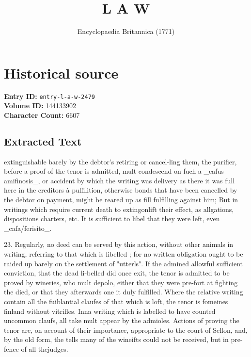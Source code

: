 \documentclass{article}
\title{L A W}
\date{Encyclopaedia Britannica (1771)}
\begin{document}
\maketitle

\section*{Historical source}
\textbf{Entry ID:} \texttt{entry-l-a-w-2479} \\
\textbf{Volume ID:} 144133902 \\
\textbf{Character Count:} 6607

\subsection*{Extracted Text}
extinguishable barely by the debtor’s retiring or cancel-ling them, the purifier, before a proof of the tenor is admitted, mult condescend on fuch a \_cafus amifinosis\_, or accident by which the writing was delivery as there it was full here in the creditors à puffilition, otherwise bonds that have been cancelled by the debtor on payment, might be reared up as fill fulfilling against him; But in writings which require current death to extingonlift their effect, as allgations, dispositions charters, etc. It is sufficient to libel that they were left, even \_cafa/ferisito\_.

23. Regularly, no deed can be served by this action, without other animals in writing, referring to that which is libelled ; for no written obligation ought to be raided up barely on the settlement of "utterls". If the admined allowful sufficient conviction, that the dead li-belled did once exit, the tenor is admitted to be proved by wineries, who mult depolo, either that they were pre-fort at fighting the died, or that they afterwards one it duly fulfilled. Where the relative writing contain all the fuiblantial claufes of that which is loft, the tenor is fomeines finland without vitrifles. Inna writing which is labelled to have counted uncommon claufs, all take mult appear by the admioles. Actions of proving the tenor are, on account of their importance, appropriate to the court of Sellon, and, by the old form, the tells many of the wineifts could not be received, but in pre- fence of all thejudges.
\end{document}

